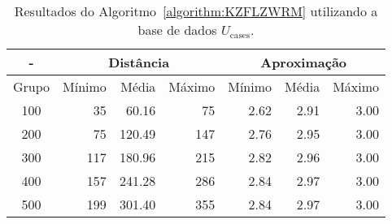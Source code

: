 \begin{table}[!htb]
  \caption{Resultados do Algoritmo~\ref{algorithm:KZFLZWRM} utilizando a base de dados $U_{\text{cases}}$.}
  \label{table:PZXCAILB}
  \centering
  \begin{tabular}{|c|r|r|r|r|r|r|}
    \hline
      -      & \multicolumn{3}{c|}{Distância}             & \multicolumn{3}{c|}{Aproximação}           \\ \hline
    Grupo    & Mínimo       & Média        & Máximo       & Mínimo       & Média        & Máximo       \\ \hline  
    100      &  35          &  60.16       &  75          & 2.62         & 2.91         & 3.00         \\ \hline
    200      &  75          & 120.49       & 147          & 2.76         & 2.95         & 3.00         \\ \hline
    300      & 117          & 180.96       & 215          & 2.82         & 2.96         & 3.00         \\ \hline
    400      & 157          & 241.28       & 286          & 2.84         & 2.97         & 3.00         \\ \hline
    500      & 199          & 301.40       & 355          & 2.84         & 2.97         & 3.00         \\ \hline    
  \end{tabular}
\end{table}